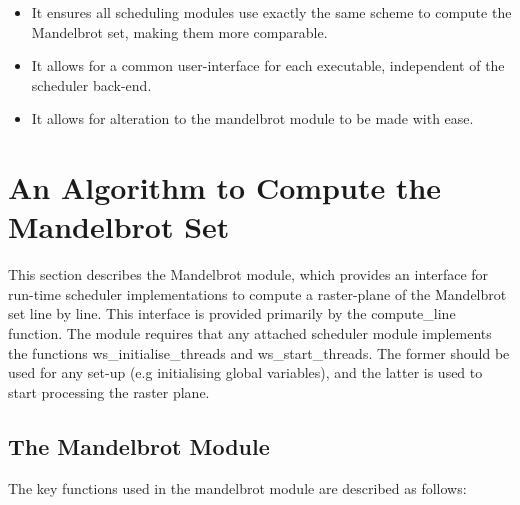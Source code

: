 \begin{itemize}
\item It ensures all scheduling modules use exactly the same scheme to compute the Mandelbrot set, making them more comparable.
\item It allows for a common user-interface for each executable, independent of the scheduler back-end.
\item It allows for alteration to the mandelbrot module to be made with ease.
\end{itemize}

\section{An Algorithm to Compute the Mandelbrot Set}
\label{sec:mandmod}

This section describes the Mandelbrot module, which provides an interface for run-time scheduler implementations to 
compute a raster-plane of the Mandelbrot set line by line. 
This interface is provided primarily by the compute\_line function. 
The module requires that any attached scheduler module implements the functions
ws\_initialise\_threads and ws\_start\_threads. 
The former should be used for any set-up (e.g initialising global variables),
and the latter is used to start processing the raster plane.

\subsection{The Mandelbrot Module}

The key functions used in the mandelbrot module are described as follows:

